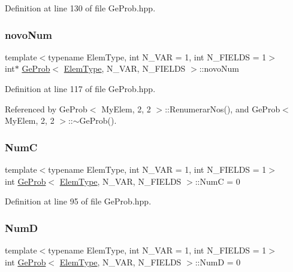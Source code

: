 Definition at line 130 of file Ge\+Prob.\+hpp.

\mbox{\label{classGeProb_ab8ee4f31d624e14988e65a7cd5c6a457}} 
\subsubsection{\texorpdfstring{novo\+Num}{novoNum}}
{\footnotesize\ttfamily template$<$typename Elem\+Type, int N\+\_\+\+V\+AR = 1, int N\+\_\+\+F\+I\+E\+L\+DS = 1$>$ \\
int$\ast$ \hyperlink{classGeProb}{Ge\+Prob}$<$ \hyperlink{spectral_8h_aaa2c1a7b2d1b12c590d730fe6ac839fa}{Elem\+Type}, N\+\_\+\+V\+AR, N\+\_\+\+F\+I\+E\+L\+DS $>$\+::novo\+Num\hspace{0.3cm}{\ttfamily [protected]}}



Definition at line 117 of file Ge\+Prob.\+hpp.



Referenced by Ge\+Prob$<$ My\+Elem, 2, 2 $>$\+::\+Renumerar\+Nos(), and Ge\+Prob$<$ My\+Elem, 2, 2 $>$\+::$\sim$\+Ge\+Prob().

\mbox{\label{classGeProb_a579ca91b970ea46b1418310eaf5d8b31}} 
\subsubsection{\texorpdfstring{NumC}{NumC}}
{\footnotesize\ttfamily template$<$typename Elem\+Type, int N\+\_\+\+V\+AR = 1, int N\+\_\+\+F\+I\+E\+L\+DS = 1$>$ \\
int \hyperlink{classGeProb}{Ge\+Prob}$<$ \hyperlink{spectral_8h_aaa2c1a7b2d1b12c590d730fe6ac839fa}{Elem\+Type}, N\+\_\+\+V\+AR, N\+\_\+\+F\+I\+E\+L\+DS $>$\+::NumC = 0\hspace{0.3cm}{\ttfamily [protected]}}



Definition at line 95 of file Ge\+Prob.\+hpp.

\mbox{\label{classGeProb_a1b63e3bc1b1f5e6582a87b044bbd4ccd}} 
\subsubsection{\texorpdfstring{NumD}{NumD}}
{\footnotesize\ttfamily template$<$typename Elem\+Type, int N\+\_\+\+V\+AR = 1, int N\+\_\+\+F\+I\+E\+L\+DS = 1$>$ \\
int \hyperlink{classGeProb}{Ge\+Prob}$<$ \hyperlink{spectral_8h_aaa2c1a7b2d1b12c590d730fe6ac839fa}{Elem\+Type}, N\+\_\+\+V\+AR, N\+\_\+\+F\+I\+E\+L\+DS $>$\+::NumD = 0\hspace{0.3cm}{\ttfamily [protected]}}



